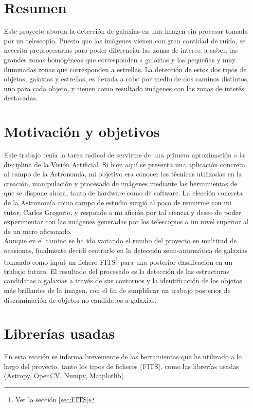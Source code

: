 \documentclass[a4paper,12pt]{article}
\begin{document}
\section*{Resumen}
Este proyecto aborda la detección de galaxias en una imagen sin procesar tomada por un telescopio. Puesto que las imágenes vienen con gran cantidad de ruido, se necesita preprocesarlas para poder diferenciar las zonas de interes, a saber, las grandes zonas homogéneas que corresponden a galaxias y las pequeñas y muy iluminadas zonas que corresponden a estrellas. La detección de estos dos tipos de objetos, galaxias y estrellas, es llevada a cabo por medio de dos caminos distintos, uno para cada objeto, y tienen como resultado imágenes con las zonas de interés destacadas.
\newpage
\renewcommand\contentsname{Índice general}
\tableofcontents
\newpage
\section{Motivación y objetivos}
Este trabajo tenía la tarea radical de servirme de una primera aproximación a la disciplina de la Visión Artificial. Si bien aquí se presenta una aplicación concreta al campo de la Astronomía, mi objetivo era conocer las técnicas utilizadas en la creación, manipulación y procesado de imágenes mediante las herramientas de que se dispone ahora, tanto de hardware como de software. La elección concreta de la Astronomía como campo de estudio surgió al poco de reunirme con mi tutor, Carlos Gregorio, y responde a mi afición por tal ciencia y deseo de poder experimentar con las imágenes generadas por los telescopios a un nivel superior al de un mero aficionado.
\\
Aunque en el camino se ha ido variando el rumbo del proyecto en multitud de ocasiones, finalmente decidí centrarlo en la detección semi-automática de galaxias tomando como input un fichero FITS\footnote{Ver la sección \ref{sec:FITS}} para una posterior clasificación en un trabajo futuro. El resultado del procesado es la detección de las estructuras candidatas a galaxias a través de sus contornos y la identificación de los objetos más brillantes de la imagen, con el fin de simplificar un trabajo posterior de discriminación de objetos no candidatos a galaxias.

\section{Librerías usadas}

En esta sección se informa brevemente de las herramientas que he utilizado a lo largo del proyecto, tanto los tipos de ficheros (FITS), como las librerías usadas (Astropy, OpenCV, Numpy, Matplotlib).
\end{document}
